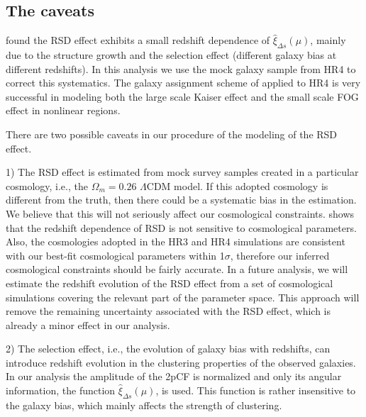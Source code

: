 \documentclass[iop]{emulateapj}
\begin{document}


\subsection{The caveats}\label{sec:caveats}

\cite{Li2014,Li2015} found the RSD effect exhibits a small redshift dependence of $\hat \xi_{\Delta s}(\mu)$, 
mainly due to the structure growth and the selection effect
(different galaxy bias at different redshifts).
In this analysis we use the mock galaxy sample from HR4 to correct this systematics.
The galaxy assignment scheme of \cite{hong2016} applied to HR4 is very successful in modeling both the 
large scale Kaiser effect and the small scale FOG effect in nonlinear regions.

There are two possible caveats in our procedure of the modeling of the RSD effect.

1) The RSD effect is estimated from mock survey samples created in a particular cosmology, 
i.e., the $\Omega_m=0.26$ $\Lambda$CDM model. %
If this adopted cosmology is different from the truth, then there could be a systematic bias in the estimation. %
We believe that this will not seriously affect our cosmological constraints.
\cite{Li2014} shows that the redshift dependence of RSD is not sensitive to cosmological parameters.
Also, the cosmologies adopted in the HR3 and HR4 simulations are consistent with our best-fit cosmological parameters within 1$\sigma$,
therefore our inferred cosmological constraints should be fairly accurate.
In a future analysis,
we will estimate the redshift evolution of the RSD effect from a set of cosmological simulations 
covering the relevant part of the parameter space.
This approach will remove the remaining uncertainty associated with the RSD effect, 
which is already a minor effect in our analysis.


2) The selection effect, i.e., the evolution of galaxy bias with redshifts, 
can introduce redshift evolution in the clustering properties of the observed galaxies.
In our analysis the amplitude of the 2pCF is normalized and only its angular information, 
the function $\hat \xi_{\Delta s}(\mu)$, is used.
This function is rather insensitive to the galaxy bias,
which mainly affects the strength of clustering.
\end{document}
